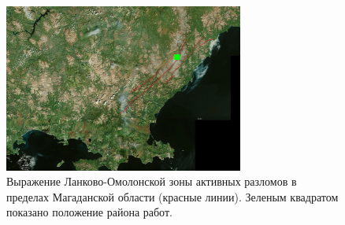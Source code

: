 \begin{figure}[H]
  \begin{center}
    \includegraphics[width=0.7\textwidth]{authors/kondratev-fig1.png}
  \end{center}
  \caption {
	  Выражение Ланково-Омолонской зоны активных разломов в пределах Магаданской области (красные линии). Зеленым квадратом показано положение района работ.
}

\end{figure}
